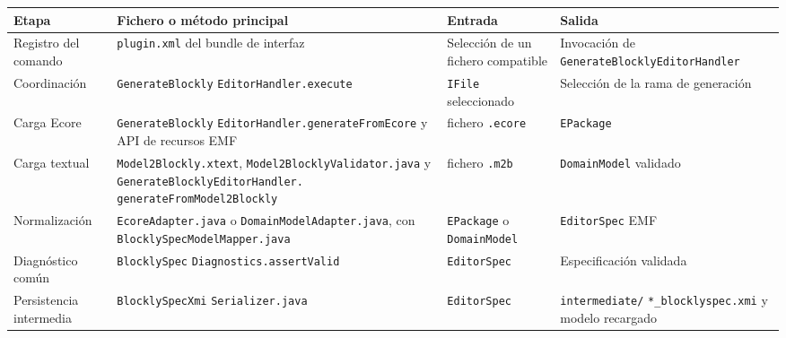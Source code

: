 \begin{table}[htbp]
  \centering
  \footnotesize
  \setlength{\tabcolsep}{4pt}
  \renewcommand{\arraystretch}{1.08}
  \begin{tabular}{@{}
      >{\raggedright\arraybackslash}p{}
      >{\raggedright\arraybackslash}p{}
      >{\raggedright\arraybackslash}p{}
      >{\raggedright\arraybackslash}p{}@{}}
    \toprule
    Etapa & Fichero o método principal & Entrada & Salida \\
    \midrule
    Registro del comando & \texttt{plugin.xml} del bundle de interfaz &
    Selección de un fichero compatible & Invocación de
    \texttt{GenerateBlockly}\allowbreak\texttt{EditorHandler} \\

    Coordinación & \texttt{GenerateBlockly}\allowbreak
    \texttt{EditorHandler.}\allowbreak\texttt{execute} &
    \texttt{IFile} seleccionado & Selección de la rama de generación \\

    Carga Ecore & \texttt{GenerateBlockly}\allowbreak
    \texttt{EditorHandler.}\allowbreak\texttt{generateFromEcore} y API de
    recursos EMF &
    fichero \texttt{.ecore} & \texttt{EPackage} \\

    Carga textual & \texttt{Model2Blockly.xtext},
    \texttt{Model2Blockly}\allowbreak\texttt{Validator.java} y
    \texttt{GenerateBlockly}\allowbreak\texttt{EditorHandler.}
    \allowbreak\texttt{generateFrom}\allowbreak\texttt{Model2Blockly} &
    fichero \texttt{.m2b} & \texttt{DomainModel} validado \\

    Normalización & \texttt{EcoreAdapter.java} o
    \texttt{DomainModelAdapter.java}, con
    \texttt{BlocklySpec}\allowbreak\texttt{ModelMapper.java} &
    \texttt{EPackage} o \texttt{DomainModel} & \texttt{EditorSpec} EMF \\

    Diagnóstico común & \texttt{BlocklySpec}\allowbreak
    \texttt{Diagnostics.}\allowbreak\texttt{assertValid} &
    \texttt{EditorSpec} & Especificación validada \\

    Persistencia intermedia & \texttt{BlocklySpecXmi}\allowbreak
    \texttt{Serializer.java} &
    \texttt{EditorSpec} & \texttt{intermediate/}
    \allowbreak\texttt{*\_blockly}\allowbreak\texttt{spec.xmi} y modelo
    recargado \\


\end{tabular}
\end{table}
